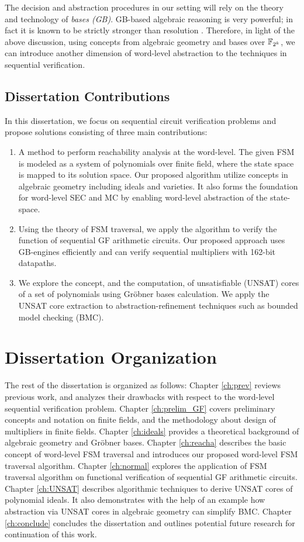 The decision and abstraction procedures in our setting will rely on
the theory and technology of {\it \Grobner bases (GB)}. GB-based
algebraic reasoning is very powerful; in fact it is known to be
strictly stronger than resolution \cite{CEI:stoc-96}. Therefore, in
light of the above discussion, using concepts from algebraic geometry
and \Grobner bases over ${\mathbb{F}}_{2^k}$, we can introduce another dimension of
word-level abstraction to the techniques in sequential verification. 

\subsection{Dissertation Contributions}
In this dissertation, we focus on sequential circuit verification problems and 
propose solutions consisting of three main contributions: 
\begin{enumerate}[{1)}]
\item A method to perform reachability analysis at the word-level. 
	The given FSM is modeled as a system of polynomials over finite field,
	where the state space is mapped to its solution space.
	Our proposed algorithm utilize concepts in algebraic geometry including ideals and varieties.
	It also forms the foundation for word-level SEC and MC by enabling word-level abstraction of the
  state-space.
\item Using the theory of FSM traversal, we apply the algorithm to verify the 
function of sequential GF arithmetic circuits. Our proposed approach uses GB-engines efficiently 
and can verify sequential multipliers with 162-bit datapaths.
\item We explore the concept, and the computation, of unsatisfiable (UNSAT)
  cores of  a set of polynomials using Gr\"obner bases calculation. We apply the UNSAT core extraction 
  to abstraction-refinement
  techniques such as bounded model checking (BMC). 
\end{enumerate}

\section{Dissertation Organization}
The rest of the dissertation is organized as
follows: Chapter \ref{ch:prev} reviews previous work, and analyzes their drawbacks with respect to 
the word-level sequential verification problem.
Chapter \ref{ch:prelim_GF} covers preliminary
concepts and notation on finite fields, and the methodology about design of multipliers in finite fields.
Chapter \ref{ch:ideals} provides a theoretical background of algebraic geometry and Gr\"obner bases.
Chapter \ref{ch:reacha} describes the basic
concept of word-level FSM traversal and introduces our proposed word-level FSM traversal algorithm. 
Chapter \ref{ch:normal} explores the application of FSM traversal algorithm on 
functional verification of sequential GF arithmetic circuits. Chapter \ref{ch:UNSAT} describes
algorithmic techniques to derive UNSAT cores of polynomial
ideals. It also demonstrates with the help of an example how abstraction via
UNSAT cores in algebraic geometry can simplify BMC. 
Chapter \ref{ch:conclude} concludes the dissertation and outlines potential future research for
continuation of this work.